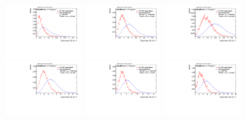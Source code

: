\begin{figure}
\bigskip
\includegraphics[width=0.3\textwidth]{sascha_input/Appendix/Distributions/w/distributions/beta17/h_recoJet_D2_17_bin1.pdf} \hspace{1mm}
\includegraphics[width=0.3\textwidth]{sascha_input/Appendix/Distributions/w/distributions/beta17/h_recoJet_D2_17_bin2.pdf} \hspace{1mm}
\includegraphics[width=0.3\textwidth]{sascha_input/Appendix/Distributions/w/distributions/beta17/h_recoJet_D2_17_bin3.pdf} 
\bigskip
\includegraphics[width=0.3\textwidth]{sascha_input/Appendix/Distributions/w/distributions/beta17/h_recoJet_D2_17_bin4.pdf} \hspace{1mm}
\includegraphics[width=0.3\textwidth]{sascha_input/Appendix/Distributions/w/distributions/beta17/h_recoJet_D2_17_bin5.pdf} \hspace{1mm}
\includegraphics[width=0.3\textwidth]{sascha_input/Appendix/Distributions/w/distributions/beta17/h_recoJet_D2_17_bin6.pdf}

\end{figure}
